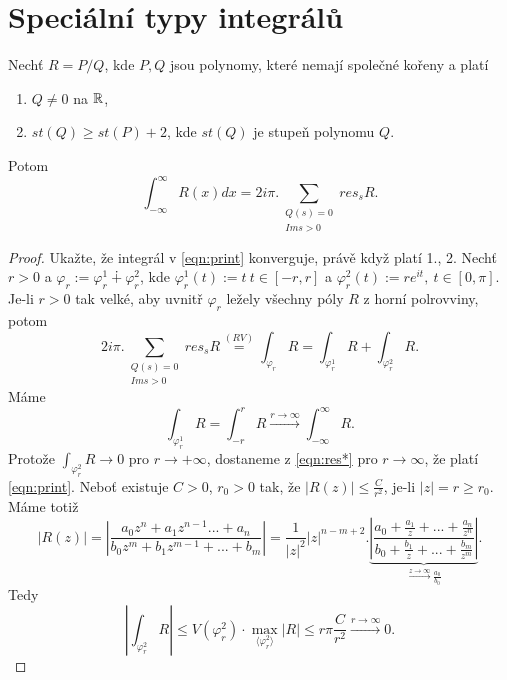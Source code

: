 \section{Speciální typy integrálů}
\begin{theorem}
Nechť $R=P/Q$, kde $P,Q$ jsou polynomy, které nemají společné kořeny a platí 
\begin{enumerate}
    \item $Q\neq0$ na $\operatorname{\mathbb{R}} $,
    \item $st(Q)\geq st(P)+2$, kde $st(Q)$ je stupeň polynomu $Q$.
\end{enumerate}
Potom
\begin{equation}
    \int_{-\infty}^\infty{R(x)dx}=2i\pi.\sum_{\begin{array}{cc}
         Q(s)=0  \\
         {Im}{s}>0 
    \end{array}}{res_s{R}}.
    \label{eqn:print}
\end{equation}
\end{theorem}
\begin{proof}
Ukažte, že integrál v \cref{eqn:print} konverguje, právě když platí 1., 2. Nechť $r>0$ a $\varphi_r:=\varphi^1_r\dotplus\varphi^2_r$, kde $\varphi^1_r(t):=t\ t\in[-r,r]$ a $\varphi^2_r(t):=re^{it},\ t\in[0,\pi]$. Je-li $r>0$ tak velké, aby uvnitř $\varphi_r$ ležely všechny póly $R$ z horní polrovviny, potom
\begin{equation}
    2i\pi.\sum_{\begin{array}{cc}
         Q(s)=0  \\
         {Im}{s}>0 
    \end{array}}{res_s{R}}
    \overset{(RV)}{=}
    \int_{\varphi_r}{R}=
    \int_{\varphi_r^1}{R} +\int_{\varphi_r^2}{R}.
    \label{eqn:res*}
\end{equation}
Máme 
$$\int_{\varphi_r^1}{R}=
\int_{-r}^r{R}\overset{r\to\infty}{\longrightarrow}
\int_{-\infty}^\infty{R}.$$
Protože $\int_{\varphi_r^2}{R}\to{0}$ pro $r\to{+\infty}$, dostaneme z \cref{eqn:res*} pro $r\to\infty$, že platí \cref{eqn:print}.  Neboť existuje $C>0$, $r_0>0$ tak, že $|R(z)|\leq\frac{C}{r^2}$, je-li $|z|=r\geq{r_0}$. Máme totiž
$$|R(z)|=\left|\frac{a_0 z^n+a_1 z^{n-1}...+a_n}{b_0 z^m+b_1 z^{m-1}+...+b_m}\right|=\frac{1}{|z|^2}|z|^{n-m+2}.\underset{\overset{z\to\infty}{\longrightarrow}\frac{a_0}{b_0}}{\underbrace{\left|\frac{a_0+\frac{a_1}{z}+...+\frac{a_n}{z^n}}{b_0+\frac{b_1}{z}+...+\frac{b_m}{z^m}}\right|}}.$$
Tedy
$$\left|\int_{\varphi^2_r}{R}\right|\leq V(\varphi^2_r)\cdot\max_{\langle{\varphi^2_r}\rangle}{|R|}
\leq r\pi\frac{C}{r^2}\overset{r\to\infty}{\longrightarrow}0.$$
\end{proof}

